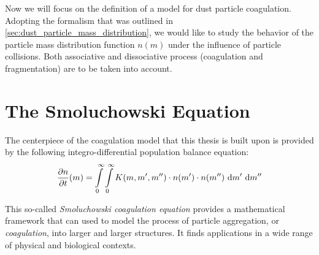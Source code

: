 



Now we will focus on the definition of a model for dust particle coagulation. \\

Adopting the formalism that was outlined in \cref{sec:dust_particle_mass_distribution},
we would like to study the behavior of the particle mass distribution function $n(m)$
under the influence of particle collisions. Both associative and dissociative process 
(coagulation and fragmentation) are to be taken into account.

\section{The Smoluchowski Equation}

    The centerpiece of the coagulation model that this thesis is built upon is provided by 
    the following integro-differential population balance equation:
    \begin{equation}
        \label{eq:continuous_smoluchowski_equation}
        \frac{\partial n}{\partial t}(m)
            =
                \int\limits_0^\infty
                \int\limits_0^\infty
                K(m,m',m'')
                \cdot n(m')
                \cdot n(m'')
                \ \text{d} m'
                \ \text{d} m''
    \end{equation}

    This so-called \textit{Smoluchowski coagulation equation} provides a mathematical framework 
    that can used to model the process of particle aggregation, or \textit{coagulation}, 
    into larger and larger structures. It finds applications in a wide range of physical 
    and biological contexts. \\ %

